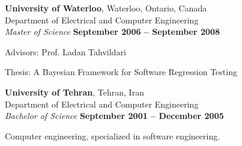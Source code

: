 \documentclass[margin,line,letterpaper]{resume}
\begin{document}
\begin{resume}
    \textbf{University of Waterloo}, Waterloo, Ontario, Canada\\
    Department of Electrical and Computer Engineering\vspace{2mm}\\\vspace{1mm}%
    \textsl{Master of Science} \hfill \textbf{ September 2006 -- September 2008}\vspace{-3mm}\\\vspace{-1mm}%
    \begin{list2}
        \item Advisors:  Prof. Ladan Tahvildari
        \item Thesis: A Bayesian Framework for Software Regression Testing
    \end{list2}\vspace{-1.5mm}
    \textbf{University of Tehran}, Tehran, Iran\\
    Department of Electrical and Computer Engineering \vspace{2mm}\\\vspace{1mm}%
    \textsl{Bachelor of Science} \hfill \textbf{ September 2001 -- December 2005}\vspace{-3mm}\\\vspace{-1mm}%
    \begin{list2}
        \item Computer engineering, specialized in software engineering.
    \end{list2}\vspace{-1.5mm}



\end{resume}
\end{document}
